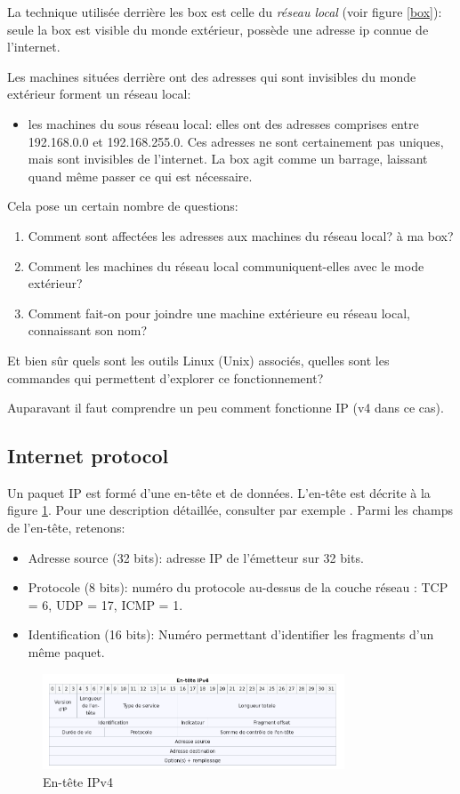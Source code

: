 La technique utilisée derrière les  \og   box\fg{} est celle du
\emph{réseau local} (voir figure \ref{box}): seule la  \og   box\fg{}
est visible du monde extérieur, possède une adresse ip connue de
l'internet.

Les machines situées derrière ont des adresses qui sont invisibles du
monde extérieur forment un réseau local:

\begin{itemize}
  \item les machines du sous réseau local: elles  ont des adresses
    comprises entre 
  192.168.0.0 et 192.168.255.0. Ces adresses ne sont certainement pas
  uniques, mais sont invisibles de l'internet. La \og box\fg{} agit
    comme un barrage, laissant quand même passer ce qui est nécessaire.

\end{itemize}
Cela pose un certain nombre de questions:
\begin{enumerate}

\item Comment sont affectées
  les adresses aux machines du réseau local? à ma \og box\fg?
\item Comment les machines du réseau local
  communiquent-elles avec le mode extérieur?
\item Comment fait-on pour joindre une machine extérieure eu réseau
  local, connaissant son nom?
\end{enumerate}

Et bien sûr quels sont les outils Linux (Unix) associés, quelles sont
les commandes qui permettent d'explorer ce fonctionnement?

Auparavant il faut comprendre un peu comment fonctionne IP (v4 dans ce
cas).
\subsection{Internet protocol}
Un paquet IP est formé d'une en-tête et de données. L'en-tête est
décrite à la figure \ref{entetev4}. Pour une description détaillée,
consulter par exemple \cite{v4}. Parmi les champs de l'en-tête,
retenons:
\begin{itemize}
  \item Adresse source (32 bits):
    adresse IP de l'émetteur sur 32 bits.
  \item Protocole (8 bits):
    numéro du protocole au-dessus de la couche réseau : TCP = 6, UDP =
    17, ICMP = 1.
   \item Identification (16 bits):
    Numéro permettant d'identifier les fragments d'un même paquet.
\end{itemize}
\begin{figure}
  \includegraphics[width=0.8\textwidth]{images/entetev4.png}
  \caption{En-tête IPv4}\label{entetev4}
\end{figure}
